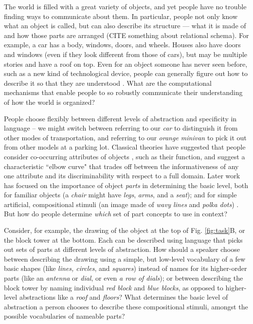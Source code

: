 \documentclass[10pt,letterpaper]{article}
\begin{document}
The world is filled with a great variety of objects, and yet people have no trouble finding ways to communicate about them. 
In particular, people not only know what an object is called, but can also describe its structure --- what it is made of and how those parts are arranged (CITE something about relational schema).
For example, a car has a body, windows, doors, and wheels. 
Houses also have doors and windows (even if they look different from those of cars), but may be multiple stories and have a roof on top.
Even for an object someone has never seen before, such as a new kind of technological device, people can generally figure out how to describe it so that they are understood \cite{hawkins2020characterizing}. 
What are the computational mechanisms that enable people to so robustly communicate their understanding of how the world is organized?



\cite{biederman1987recognition}
\cite{palmer1977hierarchical}
\cite{tversky1984objects}
\cite{rosch1976basic}

People choose flexibly between different levels of abstraction and specificity in language -- we might switch between referring to our \textit{car} to distinguish it from other modes of transportation, and referring to our \textit{orange minivan} to pick it out from other models at a parking lot.
Classical theories have suggested that people consider co-occurring attributes of objects , such as their function, and suggest a characteristic ``elbow curve" that trades off between the informativeness of any one attribute and its discriminability with respect to a full domain. Later work has focused on the importance of object \textit{parts} in determining the basic level, both for familiar objects (a \textit{chair} might have \textit{legs}, \textit{arms}, and a \textit{seat}); and for simple artificial, compositional stimuli (an image made of \textit{wavy lines} and \textit{polka dots}) . But how do people determine \textit{which} set of part concepts to use in context?

Consider, for example, the drawing of the object at the top of Fig. \ref{fig:task}B, or the block tower at the bottom. Each can be described using language that picks out sets of parts at different levels of abstraction. How should a speaker choose between describing the drawing using a simple, but low-level vocabulary of a few basic shapes (like \textit{lines, circles}, and \textit{squares}) instead of names for its higher-order parts (like an \textit{antenna} or \textit{dial}, or even \textit{a row of dials}); or between describing the block tower by naming individual \textit{red block} and \textit{blue blocks}, as opposed to higher-level abstractions like a \textit{roof} and \textit{floors}? What determines the basic level of abstraction a person chooses to describe these compositional stimuli, amongst the possible vocabularies of nameable parts?
\end{document}
